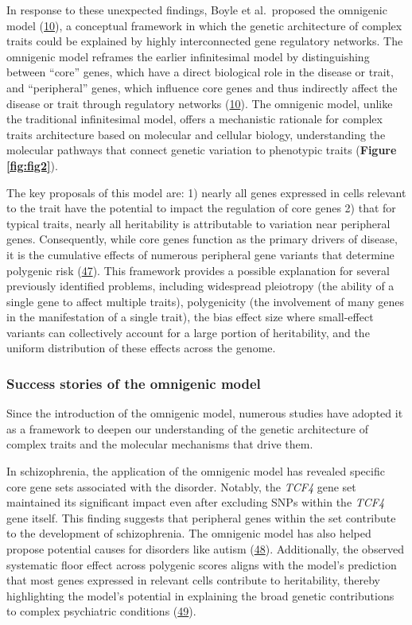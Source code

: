 In response to these unexpected findings, Boyle et al.~proposed the omnigenic model (\protect\hyperlink{ref-vpIDZCSa}{10}), a conceptual framework in which the genetic architecture of complex traits could be explained by highly interconnected gene regulatory networks.
The omnigenic model reframes the earlier infinitesimal model by distinguishing between ``core'' genes, which have a direct biological role in the disease or trait, and ``peripheral'' genes, which influence core genes and thus indirectly affect the disease or trait through regulatory networks (\protect\hyperlink{ref-vpIDZCSa}{10}).
The omnigenic model, unlike the traditional infinitesimal model, offers a mechanistic rationale for complex traits architecture based on molecular and cellular biology, understanding the molecular pathways that connect genetic variation to phenotypic traits (\textbf{Figure \ref{fig:fig2}}).

The key proposals of this model are: 1) nearly all genes expressed in cells relevant to the trait have the potential to impact the regulation of core genes 2) that for typical traits, nearly all heritability is attributable to variation near peripheral genes.
Consequently, while core genes function as the primary drivers of disease, it is the cumulative effects of numerous peripheral gene variants that determine polygenic risk (\protect\hyperlink{ref-LXvTZzEA}{47}).
This framework provides a possible explanation for several previously identified problems, including widespread pleiotropy (the ability of a single gene to affect multiple traits), polygenicity (the involvement of many genes in the manifestation of a single trait), the bias effect size where small-effect variants can collectively account for a large portion of heritability, and the uniform distribution of these effects across the genome.

\hypertarget{success-stories-of-the-omnigenic-model}{%
\subsubsection{Success stories of the omnigenic model}\label{success-stories-of-the-omnigenic-model}}

Since the introduction of the omnigenic model, numerous studies have adopted it as a framework to deepen our understanding of the genetic architecture of complex traits and the molecular mechanisms that drive them.

In schizophrenia, the application of the omnigenic model has revealed specific core gene sets associated with the disorder.
Notably, the \emph{TCF4} gene set maintained its significant impact even after excluding SNPs within the \emph{TCF4} gene itself.
This finding suggests that peripheral genes within the set contribute to the development of schizophrenia. The omnigenic model has also helped propose potential causes for disorders like autism (\protect\hyperlink{ref-QOu3jHOO}{48}).
Additionally, the observed systematic floor effect across polygenic scores aligns with the model's prediction that most genes expressed in relevant cells contribute to heritability, thereby highlighting the model's potential in explaining the broad genetic contributions to complex psychiatric conditions (\protect\hyperlink{ref-fV6THoBG}{49}).

